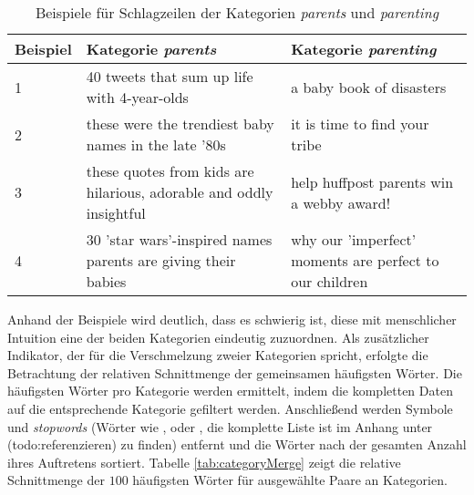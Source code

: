 \documentclass[a4paper,11pt]{article}
\begin{document}
\begin{table}[ht]
\begin{center}
\begin{tabular}{ | p{} | p{}| p{} | }
  \hline
Beispiel & Kategorie \textit{parents}  & Kategorie \textit{parenting} \\ 
  \hline
1 & 40 tweets that sum up life with 4-year-olds & a baby book of disasters \\ 
  2 & these were the trendiest baby names in the late '80s & it is time to find your tribe \\ 
  3 & these quotes from kids are hilarious, adorable and oddly insightful & help huffpost parents win a webby award! \\ 
  4 & 30  'star wars'-inspired names parents are giving their babies & why our 'imperfect' moments are perfect to our children \\ 
   \hline
\end{tabular}
\caption{Beispiele für Schlagzeilen der Kategorien \textit{parents} und \textit{parenting}}
\label{tab:parentsMerge}
\end{center}
\end{table}

Anhand der Beispiele wird deutlich, dass es schwierig ist, diese mit menschlicher Intuition eine der beiden Kategorien eindeutig zuzuordnen. Als zusätzlicher Indikator, der für die Verschmelzung zweier Kategorien spricht, erfolgte die Betrachtung der relativen Schnittmenge der gemeinsamen häufigsten Wörter. Die häufigsten Wörter pro Kategorie werden ermittelt, indem die kompletten Daten auf die entsprechende Kategorie gefiltert werden. Anschließend werden Symbole und \textit{stopwords} (Wörter wie ,  oder , die komplette Liste ist im Anhang unter (todo:referenzieren) zu finden) entfernt und die Wörter nach der gesamten Anzahl ihres Auftretens sortiert. Tabelle \ref{tab:categoryMerge} zeigt die relative Schnittmenge der $100$ häufigsten Wörter für ausgewählte Paare an Kategorien.
\end{document}
